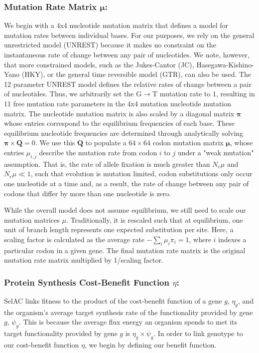 \documentclass{article}
\newcommand{\Nemu}{\ensuremath{{N_e \mu}}\xspace} %
\newcommand{\pimatrix}{\ensuremath{\mathbf{\pi}}\xspace}
\newcommand{\mumatrix}{\ensuremath{\mathbf{\mu}}\xspace}
\newcommand{\Qmatrix}{\ensuremath{\mathbf{Q}}\xspace}
\newcommand{\selac}{SelAC\xspace}
\newcommand{\etag}{\ensuremath{\eta_g}\xspace}
\newcommand{\muij}{\ensuremath{\mu_{i,j}}\xspace}
\newcommand{\psig}{\ensuremath{\psi_{g}}\xspace}
\begin{document}
\subsubsection*{Mutation Rate Matrix \mumatrix: }
We begin with a 4x4 nucleotide mutation matrix that defines a model for mutation rates between individual bases.
For our purposes, we rely on the general unrestricted model (UNREST) \citep{Yang1994} because it makes no constraint on the instantaneous rate of change between any pair of nucleotides.
We note, however, that more constrained models, such as the Jukes-Cantor (JC), Hasegawa-Kishino-Yano (HKY), or the general time reversible model (GTR), can also be used.
The 12 parameter UNREST model defines the relative rates of change between a pair of nucleotides.
Thus, we arbitrarily set the G$\rightarrow$T mutation rate to 1, resulting in 11 free mutation rate parameters in the 4x4 mutation nucleotide mutation matrix.
The nucleotide mutation matrix is also scaled by a diagonal matrix \pimatrix whose entries correspond to the equilibrium frequencies of each base.
These equilibrium nucleotide frequencies are determined through analytically solving $\pimatrix \times \Qmatrix = 0$. 
We use this \Qmatrix to populate a $64 \times 64$ codon mutation matrix $\mumatrix$, whose entries $\muij$ describe the mutation rate from codon $i$ to $j$ under a "weak mutation" assumption.
That is, the rate of allele fixation is much greater than \Nemu and $\Nemu \ll 1$, such that evolution is mutation limited, codon substitutions only occur one nucleotide at a time and, as a result, the rate of change between any pair of codons that differ by more than one nucleotide is zero.

While the overall model does not assume equilibrium, we still need to scale our mutation matrices $\mu$.
Traditionally, it is rescaled such that at equilibrium, one unit of branch length represents one expected substitution per site.
Here, a scaling factor is calculated as the average rate $-\sum_i \mu_i \pi_i=1$, where $i$ indexes a particular codon in a given gene.
The final mutation rate matrix is the original mutation rate matrix multiplied by 1/scaling factor.

\subsubsection*{Protein Synthesis Cost-Benefit Function $\eta$: }
\selac links fitness to the product of the cost-benefit function of a gene $g$, $\etag$, and the organism's average target synthesis rate of the functionality provided by gene $g$, $\psig$.
This is because the average flux energy an organism spends to met its target functionality provided by gene $g$ is $\etag \times \psig$.
In order to link genotype to our cost-benefit function $\eta$, we begin by defining our benefit function.
\end{document}

